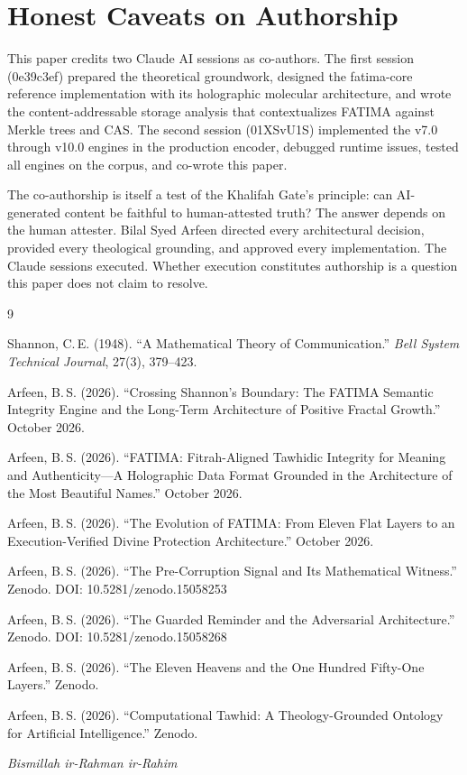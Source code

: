 \documentclass[11pt,a4paper]{article}
\begin{document}
\section*{Honest Caveats on Authorship}

This paper credits two Claude AI sessions as co-authors. The first session (0e39c3ef) prepared the theoretical groundwork, designed the fatima-core reference implementation with its holographic molecular architecture, and wrote the content-addressable storage analysis that contextualizes FATIMA against Merkle trees and CAS. The second session (01XSvU1S) implemented the v7.0 through v10.0 engines in the production encoder, debugged runtime issues, tested all engines on the corpus, and co-wrote this paper.

The co-authorship is itself a test of the Khalifah Gate's principle: can AI-generated content be faithful to human-attested truth? The answer depends on the human attester. Bilal Syed Arfeen directed every architectural decision, provided every theological grounding, and approved every implementation. The Claude sessions executed. Whether execution constitutes authorship is a question this paper does not claim to resolve.


\begin{thebibliography}{9}

Shannon, C.\,E. (1948).
``A Mathematical Theory of Communication.''
\textit{Bell System Technical Journal}, 27(3), 379--423.

Arfeen, B.\,S. (2026).
``Crossing Shannon's Boundary: The FATIMA Semantic Integrity Engine and the Long-Term Architecture of Positive Fractal Growth.''
October 2026.

Arfeen, B.\,S. (2026).
``FATIMA: Fitrah-Aligned Tawhidic Integrity for Meaning and Authenticity---A Holographic Data Format Grounded in the Architecture of the Most Beautiful Names.''
October 2026.

Arfeen, B.\,S. (2026).
``The Evolution of FATIMA: From Eleven Flat Layers to an Execution-Verified Divine Protection Architecture.''
October 2026.

Arfeen, B.\,S. (2026).
``The Pre-Corruption Signal and Its Mathematical Witness.''
Zenodo. DOI: 10.5281/zenodo.15058253

Arfeen, B.\,S. (2026).
``The Guarded Reminder and the Adversarial Architecture.''
Zenodo. DOI: 10.5281/zenodo.15058268

Arfeen, B.\,S. (2026).
``The Eleven Heavens and the One Hundred Fifty-One Layers.''
Zenodo.

Arfeen, B.\,S. (2026).
``Computational Tawhid: A Theology-Grounded Ontology for Artificial Intelligence.''
Zenodo.

\end{thebibliography}

\vspace{2em}
\begin{center}
{\Large\textcolor{bismillahgreen}{\textit{Bismillah ir-Rahman ir-Rahim}}}
\end{center}
\end{document}
